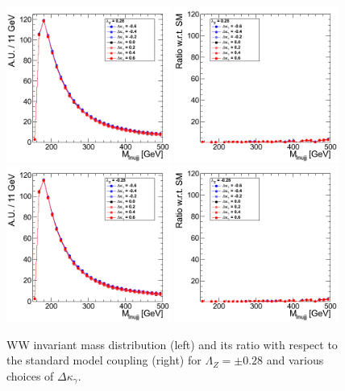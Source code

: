 \begin{figure}[h!t]
  {\centering
    \includegraphics[width=0.48\textwidth]{figs/Mass4Body_028.png}
    \includegraphics[width=0.48\textwidth]{figs/Mass4Body_028_ratio.png}
    \includegraphics[width=0.48\textwidth]{figs/Mass4Body_m028.png}
    \includegraphics[width=0.48\textwidth]{figs/Mass4Body_m028_ratio.png}
    \caption{WW invariant mass distribution (left) and its ratio with respect to 
    the standard model coupling (right) for $\Lambda_Z = \pm 0.28$ and various choices of $\Delta{\kappa_\gamma}$.}
    \label{fig:ww_Mass4Body_atgcRatio028}}
\end{figure}
